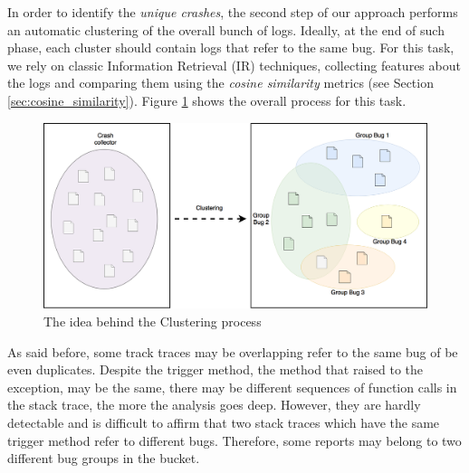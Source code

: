 In order to identify the \textit{unique crashes}, the second step of our approach performs an automatic clustering of the overall bunch of logs. Ideally, at the end of such phase, each cluster should contain logs that refer to the same bug.
For this task, we rely on classic Information Retrieval (IR) techniques, collecting features about the logs and comparing them using the \textit{cosine similarity} metrics (see Section \ref{sec:cosine_similarity}).
Figure \ref{fig: clustering} shows the overall process for this task. 
\begin{figure}[tb]
\centering 
\includegraphics[width=\columnwidth]{imgs/clusteringidea} 
\caption{The idea behind the Clustering process}
\label{fig: clustering}
\end{figure}
As said before, some track traces may be overlapping \ie refer to the same bug of be even duplicates. 
Despite the trigger method, \ie the method that raised to the exception, may be the same, there may be different sequences of function calls in the stack trace, the more the analysis goes deep. 
However, they are hardly detectable and is difficult to affirm that two stack traces which have the same trigger method refer to different bugs. 
Therefore, some reports may belong to two different bug groups in the bucket. 

